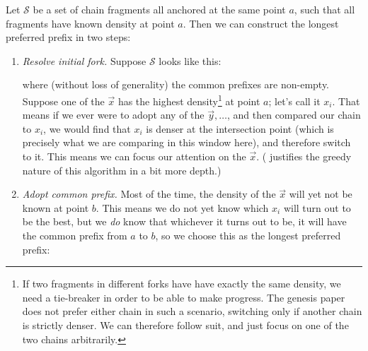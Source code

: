 \begin{definition}
\label{prefix-selection}
Let $\mathcal{S}$ be a set of chain fragments all anchored at the same point $a$,
such that all fragments have known density at point $a$. Then we can construct
the longest preferred prefix in two steps:
%
\begin{enumerate}
\item \emph{Resolve initial fork.}
Suppose $\mathcal{S}$ looks like this:
%
\begin{center}
\end{center}
%
where (without loss of generality) the common prefixes are non-empty. Suppose
one of the $\vec{x}$ has the highest density\footnote{ If two fragments in
different forks have  have exactly the same density, we need a tie-breaker in
order to be able to make progress. The genesis paper does not prefer either
chain in such a scenario, switching only if another chain is strictly denser. We
can therefore follow suit, and just focus on one of the two chains arbitrarily.}
at point $a$; let's call it $x_i$. That means if we ever were to adopt any of
the $\vec{y}, \ldots$, and then compared our chain to $x_i$, we would find that
$x_i$ is denser at the intersection point (which is precisely what we are
comparing in this window here), and therefore switch to it. This means we can
focus our attention on the $\vec{x}$. (
justifies the greedy nature of this algorithm in a bit more depth.)

\item \emph{Adopt common prefix.}
Most of the time, the density of the $\vec{x}$ will yet not be known at point
$b$. This means we do not yet know which $x_i$ will turn out to be the best, but
we \emph{do} know that whichever it turns out to be, it will have the common
prefix from $a$ to $b$, so we choose this as the longest preferred prefix:


\end{enumerate}
\end{definition}
